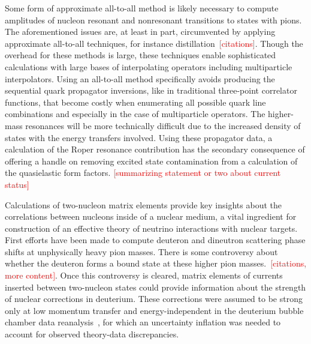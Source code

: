 Some form of approximate all-to-all method is likely necessary
 to compute amplitudes of nucleon resonant and nonresonant transitions
 to states with pions.
The aforementioned issues are, at least in part, circumvented by applying approximate
 all-to-all techniques, for instance distillation~\textcolor{red}{[citations]}.
Though the overhead for these methods is large,
 these techniques enable sophisticated calculations with large bases
 of interpolating operators including multiparticle interpolators.
Using an all-to-all method specifically avoids producing the sequential
 quark propagator inversions, like in traditional three-point correlator functions,
 that become costly when enumerating all possible quark line combinations
 and especially in the case of multiparticle operators.
The higher-mass resonances will be more technically difficult
 due to the increased density of states with the energy transfers involved.
Using these propagator data, a calculation of the Roper resonance contribution
 has the secondary consequence of offering a handle on removing excited
 state contamination from a calculation of the quasielastic form factors.
\textcolor{red}{[summarizing statement or two about current status]}

Calculations of two-nucleon matrix elements provide key insights
 about the correlations between nucleons inside of a nuclear medium,
 a vital ingredient for construction of an effective theory
 of neutrino interactions with nuclear targets.
First efforts have been made to compute deuteron and dineutron scattering phase shifts
 at unphysically heavy pion masses.
There is some controversy about whether the deuteron forms a
 bound state at these higher pion masses.~\textcolor{red}{[citations, more content]}.
Once this controversy is cleared,
 matrix elements of currents inserted between two-nucleon states could
 provide information about the strength of nuclear corrections in deuterium.
These corrections were assumed to be strong only at low momentum transfer
 and energy-independent in the deuterium bubble chamber data reanalysis~\cite{Meyer:2016oeg},
 for which an uncertainty inflation was needed to account for observed theory-data discrepancies.


